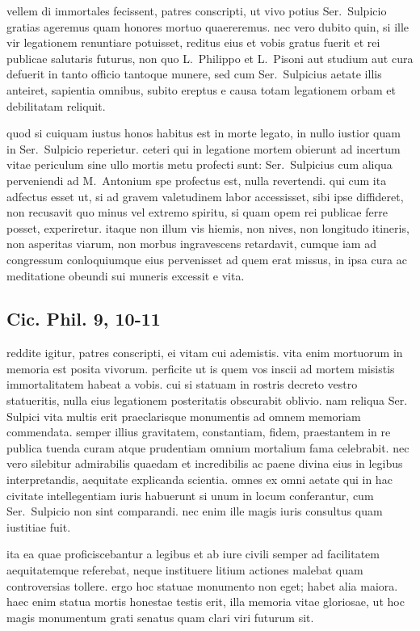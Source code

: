 
vellem di immortales fecissent, patres conscripti, ut vivo potius Ser.~Sulpicio gratias ageremus quam honores mortuo quaereremus. nec vero dubito quin, si ille vir legationem renuntiare potuisset, reditus eius et vobis gratus fuerit et rei publicae salutaris futurus, non quo L.~Philippo et L.~Pisoni aut studium aut cura defuerit in tanto officio tantoque munere, sed cum Ser.~Sulpicius aetate illis anteiret, sapientia omnibus, subito ereptus e causa totam legationem orbam et debilitatam reliquit. 

quod si cuiquam iustus honos habitus est in morte legato, in nullo iustior quam in Ser.~Sulpicio reperietur. ceteri qui in legatione mortem obierunt ad incertum vitae periculum sine ullo mortis metu profecti sunt: Ser.~Sulpicius cum aliqua perveniendi ad M.~Antonium spe profectus est, nulla revertendi. qui cum ita adfectus esset ut, si ad gravem valetudinem labor accessisset, sibi ipse diffideret, non recusavit quo minus vel extremo spiritu, si quam opem rei publicae ferre posset, experiretur. itaque non illum vis hiemis, non nives, non longitudo itineris, non asperitas viarum, non morbus ingravescens retardavit, cumque iam ad congressum conloquiumque eius pervenisset ad quem erat missus, in ipsa cura ac meditatione obeundi sui muneris excessit e vita.

\subsection{Cic. Phil. 9, 10-11}

reddite igitur, patres conscripti, ei vitam cui ademistis. vita enim mortuorum in memoria est posita vivorum. perficite ut is quem vos inscii ad mortem misistis immortalitatem habeat a vobis. cui si statuam in rostris decreto vestro statueritis, nulla eius legationem posteritatis obscurabit oblivio. nam reliqua Ser. Sulpici vita multis erit praeclarisque monumentis ad omnem memoriam commendata. semper illius gravitatem, constantiam, fidem, praestantem in re publica tuenda curam atque prudentiam omnium mortalium fama celebrabit. nec vero silebitur admirabilis quaedam et incredibilis ac paene divina eius in legibus interpretandis, aequitate explicanda scientia. omnes ex omni aetate qui in hac civitate intellegentiam iuris habuerunt si unum in locum conferantur, cum Ser.~Sulpicio non sint comparandi. nec enim ille magis iuris consultus quam iustitiae fuit. 

ita ea quae proficiscebantur a legibus et ab iure civili semper ad facilitatem aequitatemque referebat, neque instituere litium actiones malebat quam controversias tollere. ergo hoc statuae monumento non eget; habet alia maiora. haec enim statua mortis honestae testis erit, illa memoria vitae gloriosae, ut hoc magis monumentum grati senatus quam clari viri futurum sit. 
